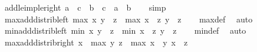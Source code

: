 \begin{isabellebody}
\endisatagproof
{\isafoldproof}%
%
\isadelimproof
\isanewline
%
\endisadelimproof
\isanewline
{}\isamarkupfalse%
\ add{\isacharunderscore}{\kern0pt}le{\isacharunderscore}{\kern0pt}imp{\isacharunderscore}{\kern0pt}le{\isacharunderscore}{\kern0pt}right{\isacharcolon}{\kern0pt}\ {\isachardoublequoteopen}a\ {\isacharplus}{\kern0pt}\ c\ {\isasymle}\ b\ {\isacharplus}{\kern0pt}\ c\ {\isasymLongrightarrow}\ a\ {\isasymle}\ b{\isachardoublequoteclose}\isanewline
%
\isadelimproof
\ \ %
\endisadelimproof
%
\isatagproof
{}\isamarkupfalse%
\ simp%
\endisatagproof
{\isafoldproof}%
%
\isadelimproof
\isanewline
%
\endisadelimproof
\isanewline
{}\isamarkupfalse%
\ max{\isacharunderscore}{\kern0pt}add{\isacharunderscore}{\kern0pt}distrib{\isacharunderscore}{\kern0pt}left{\isacharcolon}{\kern0pt}\ {\isachardoublequoteopen}max\ x\ y\ {\isacharplus}{\kern0pt}\ z\ {\isacharequal}{\kern0pt}\ max\ {\isacharparenleft}{\kern0pt}x\ {\isacharplus}{\kern0pt}\ z{\isacharparenright}{\kern0pt}\ {\isacharparenleft}{\kern0pt}y\ {\isacharplus}{\kern0pt}\ z{\isacharparenright}{\kern0pt}{\isachardoublequoteclose}\isanewline
%
\isadelimproof
\ \ %
\endisadelimproof
%
\isatagproof
{}\isamarkupfalse%
\ max{\isacharunderscore}{\kern0pt}def\ \isamarkupfalse%
\ auto%
\endisatagproof
{\isafoldproof}%
%
\isadelimproof
\isanewline
%
\endisadelimproof
\isanewline
{}\isamarkupfalse%
\ min{\isacharunderscore}{\kern0pt}add{\isacharunderscore}{\kern0pt}distrib{\isacharunderscore}{\kern0pt}left{\isacharcolon}{\kern0pt}\ {\isachardoublequoteopen}min\ x\ y\ {\isacharplus}{\kern0pt}\ z\ {\isacharequal}{\kern0pt}\ min\ {\isacharparenleft}{\kern0pt}x\ {\isacharplus}{\kern0pt}\ z{\isacharparenright}{\kern0pt}\ {\isacharparenleft}{\kern0pt}y\ {\isacharplus}{\kern0pt}\ z{\isacharparenright}{\kern0pt}{\isachardoublequoteclose}\isanewline
%
\isadelimproof
\ \ %
\endisadelimproof
%
\isatagproof
{}\isamarkupfalse%
\ min{\isacharunderscore}{\kern0pt}def\ \isamarkupfalse%
\ auto%
\endisatagproof
{\isafoldproof}%
%
\isadelimproof
\isanewline
%
\endisadelimproof
\isanewline
{}\isamarkupfalse%
\ max{\isacharunderscore}{\kern0pt}add{\isacharunderscore}{\kern0pt}distrib{\isacharunderscore}{\kern0pt}right{\isacharcolon}{\kern0pt}\ {\isachardoublequoteopen}x\ {\isacharplus}{\kern0pt}\ max\ y\ z\ {\isacharequal}{\kern0pt}\ max\ {\isacharparenleft}{\kern0pt}x\ {\isacharplus}{\kern0pt}\ y{\isacharparenright}{\kern0pt}\ {\isacharparenleft}{\kern0pt}x\ {\isacharplus}{\kern0pt}\ z{\isacharparenright}{\kern0pt}{\isachardoublequoteclose}\isanewline

\end{isabellebody}
